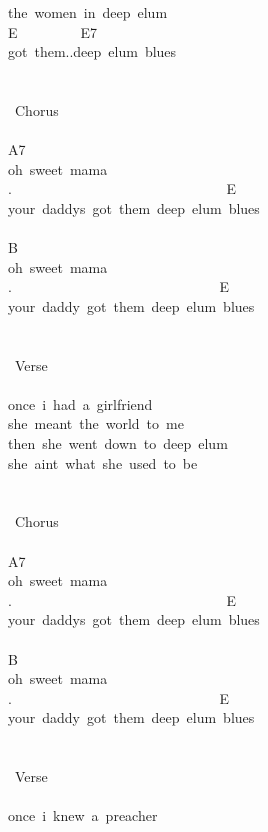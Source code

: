 {the\ women\ in\ deep\ elum\\
E\ \ \ \ \ \ \ \ \ E7\\
got\ them..deep\ elum\ blues\\
\\
\\
\lbrack\ Chorus\rbrack\\
\\
A7\\
oh\ sweet\ mama\\
. \ \ \ \ \ \ \ \ \ \ \ \ \ \ \ \ \ \ \ \ \ \ \ \ \ \ \ \ \ \ E\\
your\ daddys\ got\ them\ deep\ elum\ blues\\
\\
B\\
oh\ sweet\ mama\\
. \ \ \ \ \ \ \ \ \ \ \ \ \ \ \ \ \ \ \ \ \ \ \ \ \ \ \ \ \ E\\
your\ daddy\ got\ them\ deep\ elum\ blues\\
\\
\\
\lbrack\ Verse\rbrack\\
\\
once\ i\ had\ a\ girlfriend\\
she\ meant\ the\ world\ to\ me\\
then\ she\ went\ down\ to\ deep\ elum\\
she\ aint\ what\ she\ used\ to\ be\\
\\
\\
\lbrack\ Chorus\rbrack\\
\\
A7\\
oh\ sweet\ mama\\
. \ \ \ \ \ \ \ \ \ \ \ \ \ \ \ \ \ \ \ \ \ \ \ \ \ \ \ \ \ \ E\\
your\ daddys\ got\ them\ deep\ elum\ blues\\
\\
B\\
oh\ sweet\ mama\\
. \ \ \ \ \ \ \ \ \ \ \ \ \ \ \ \ \ \ \ \ \ \ \ \ \ \ \ \ \ E\\
your\ daddy\ got\ them\ deep\ elum\ blues\\
\\
\\
\lbrack\ Verse\rbrack\\
\\
once\ i\ knew\ a\ preacher\\
}
